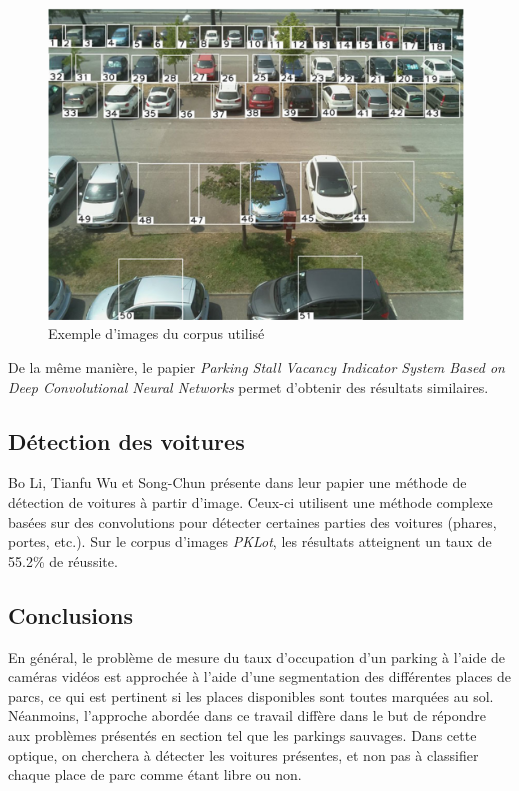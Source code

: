 \begin{figure}[ht]
    \includegraphics[width=110mm]{img/introduction/dlp_example.png}
    \centering
    \caption{Exemple d'images du corpus utilisé}
    \label{fig:dlp_example}
\end{figure} 

De la même manière, le papier \textit{Parking Stall Vacancy Indicator System Based on Deep Convolutional Neural Networks} permet d'obtenir des résultats similaires. \autocite{paper:psv}

\subsection{Détection des voitures}
Bo Li, Tianfu Wu et Song-Chun présente dans leur papier une méthode de détection de voitures à partir d'image. Ceux-ci utilisent une méthode complexe basées sur des convolutions pour détecter certaines parties des voitures (phares, portes, etc.). Sur le corpus d'images \textit{PKLot}, les résultats atteignent un taux de 55.2\% de réussite. \autocite{paper:car_detect}

\subsection{Conclusions}

En général, le problème de mesure du taux d'occupation d'un parking à l'aide de caméras vidéos est approchée à l'aide d'une segmentation des différentes places de parcs, ce qui est pertinent si les places disponibles sont toutes marquées au sol. Néanmoins, l'approche abordée dans ce travail diffère dans le but de répondre aux problèmes présentés en section  tel que les parkings sauvages. Dans cette optique, on cherchera à détecter les voitures présentes, et non pas à classifier chaque place de parc comme étant libre ou non.
